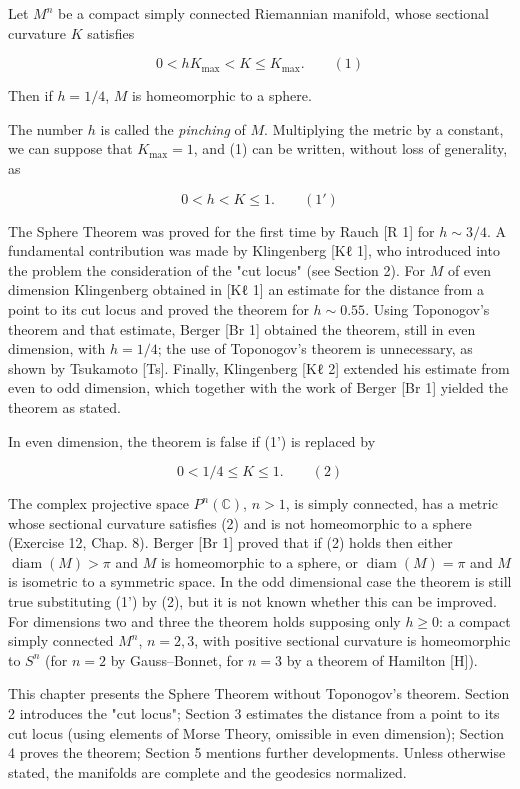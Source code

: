 \begin{theorem}
  \label{thm:dc-ch13-1-1}
  Let $M^n$ be a compact simply connected Riemannian manifold, whose sectional
  curvature $K$ satisfies
  
  $$
  0<hK_{\max}<K\leq K_{\max}.\qquad(1)
  $$
  
  Then if $h=1/4$, $M$ is homeomorphic to a sphere.
  
  The number $h$ is called the \emph{pinching} of $M$. Multiplying the metric by a
  constant, we can suppose that $K_{\max}=1$, and (1) can be written, without loss
  of generality, as
  
  $$
  0<h<K\leq 1.\qquad(1')
  $$
  
  The Sphere Theorem was proved for the first time by Rauch [R 1] for
  $h\sim 3/4$. A fundamental contribution was made by Klingenberg [Kℓ 1], who
  introduced into the problem the consideration of the "cut locus" (see Section 2).
  For $M$ of even dimension Klingenberg obtained in [Kℓ 1] an estimate for the
  distance from a point to its cut locus and proved the theorem for $h\sim 0.55$.
  Using Toponogov's theorem and that estimate, Berger [Br 1] obtained the theorem,
  still in even dimension, with $h=1/4$; the use of Toponogov's theorem is
  unnecessary, as shown by Tsukamoto [Ts]. Finally, Klingenberg [Kℓ 2] extended his
  estimate from even to odd dimension, which together with the work of Berger
  [Br 1] yielded the theorem as stated.
  
  In even dimension, the theorem is false if (1') is replaced by
  
  $$
  0<1/4\leq K\leq 1.\qquad(2)
  $$
  
  The complex projective space $P^n(\mathbb{C})$, $n>1$, is simply connected, has a
  metric whose sectional curvature satisfies (2) and is not homeomorphic to a
  sphere (Exercise 12, Chap. 8). Berger [Br 1] proved that if (2) holds then either
  $\operatorname{diam}(M)>\pi$ and $M$ is homeomorphic to a sphere, or
  $\operatorname{diam}(M)=\pi$ and $M$ is isometric to a symmetric space. In the odd
  dimensional case the theorem is still true substituting (1') by (2), but it is not
  known whether this can be improved. For dimensions two and three the theorem holds
  supposing only $h\geq 0$: a compact simply connected $M^n$, $n=2,3$, with positive
  sectional curvature is homeomorphic to $S^n$ (for $n=2$ by Gauss–Bonnet, for
  $n=3$ by a theorem of Hamilton [H]).
  
  This chapter presents the Sphere Theorem without Toponogov's theorem. Section 2
  introduces the "cut locus"; Section 3 estimates the distance from a point to its
  cut locus (using elements of Morse Theory, omissible in even dimension); Section 4
  proves the theorem; Section 5 mentions further developments. Unless otherwise
  stated, the manifolds are complete and the geodesics normalized.
\end{theorem}


